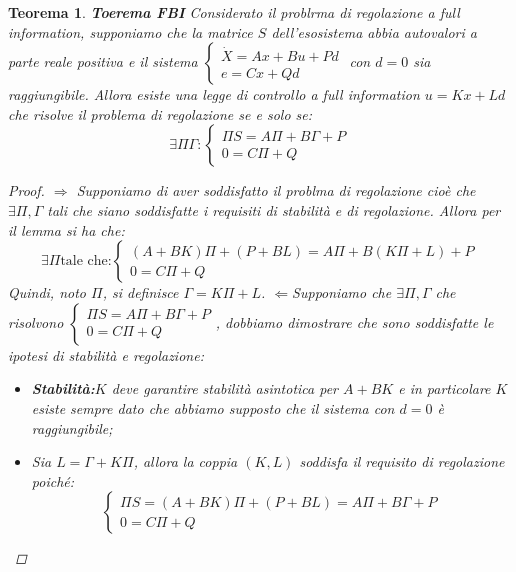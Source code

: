 \documentclass{article}
\newtheorem{theorem}{\textbf{Teorema}}
\theoremstyle{definition}
\begin{document}
\begin{theorem}{\textbf{Toerema FBI}}
    Considerato il problrma di regolazione a full information, supponiamo che la matrice \(S\) dell'esosistema abbia autovalori a parte reale positiva e il sistema \(\begin{cases}
        \dot{X}=Ax+Bu+Pd \\
        e=Cx+Qd
    \end{cases}\) con \(d=0\) sia raggiungibile. Allora esiste una legge di controllo a full information \(u=Kx+Ld\) che risolve il problema di regolazione se e solo se:\begin{equation*}
        \exists \Pi\Gamma:\begin{cases}
            \Pi S=A\Pi+B\Gamma+P\\
            0=C\Pi+Q
        \end{cases}
    \end{equation*}
    \begin{proof}
        \(\Rightarrow{} \) Supponiamo di aver soddisfatto il problma di regolazione cioè che \(\exists \Pi,\Gamma \) tali che siano soddisfatte i requisiti di stabilità e di regolazione. Allora per il lemma si ha che:\begin{equation*}
            \exists\Pi\text{tale che:}\begin{cases}
                (A+BK)\Pi+(P+BL)=A\Pi+B(K\Pi+L)+P\\
                0=C\Pi+Q
            \end{cases}
        \end{equation*}
        Quindi, noto \(\Pi \), si definisce \(\Gamma=K\Pi+L\).
        \(\Leftarrow \)Supponiamo che \(\exists\Pi,\Gamma \) che risolvono \(\begin{cases}
            \Pi S=A\Pi+B\Gamma+P\\
            0=C\Pi+Q
        \end{cases}\), dobbiamo dimostrare che sono soddisfatte le ipotesi di stabilità e regolazione:\begin{itemize}
            \item \textbf{Stabilità:}\(K\) deve garantire stabilità asintotica per \(A+BK\) e in particolare \(K\) esiste sempre dato che abbiamo supposto che il sistema con \(d=0\) è raggiungibile;
            \item Sia \(L=\Gamma+K\Pi \), allora la coppia \((K,L)\) soddisfa il requisito di regolazione poiché:\begin{equation*}
                \begin{cases}
                    \Pi S=(A+BK)\Pi+(P+BL)=A\Pi+B\Gamma+P\\
                    0=C\Pi+Q
                \end{cases}
            \end{equation*}
        \end{itemize}
    \end{proof}
\end{theorem}
\end{document}
